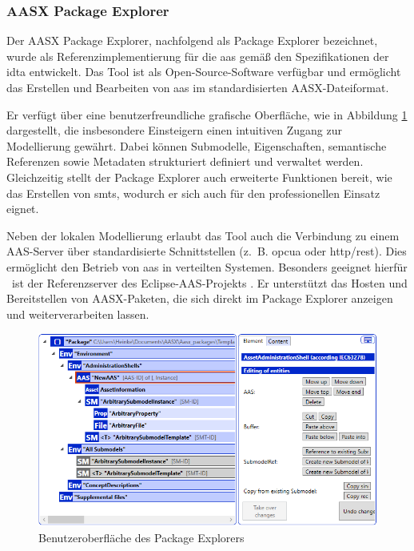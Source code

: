 \subsubsection{AASX Package Explorer}
Der AASX Package Explorer, nachfolgend als Package Explorer bezeichnet, wurde als Referenzimplementierung für die \acs{aas} gemäß den Spezifikationen der \acs{idta} entwickelt.
Das Tool ist als Open-Source-Software \cite{AASXPackageExplorer} verfügbar und ermöglicht das Erstellen und Bearbeiten von \acs{aas} im standardisierten AASX-Dateiformat.

Er verfügt über eine benutzerfreundliche grafische Oberfläche, wie in Abbildung \ref{fig:AASXPackageExplorer} dargestellt, die insbesondere Einsteigern einen intuitiven Zugang zur Modellierung gewährt.
Dabei können Submodelle, Eigenschaften, semantische Referenzen sowie Metadaten strukturiert definiert und verwaltet werden.
Gleichzeitig stellt der Package Explorer auch erweiterte Funktionen bereit, wie das Erstellen von \acsp{smt}, wodurch er sich auch für den professionellen Einsatz eignet.

Neben der lokalen Modellierung erlaubt das Tool auch die Verbindung zu einem AAS-Server über standardisierte Schnittstellen (z.~B. \acs{opcua} oder \acs{http}/\acs{rest}).
Dies ermöglicht den Betrieb von \acs{aas} in verteilten Systemen.
Besonders geeignet hierfür%
\pagebreak
~ist der Referenzserver des Eclipse-AAS-Projekts \cite{AASXServer}.
Er unterstützt das Hosten und Bereitstellen von AASX-Paketen, die sich direkt im Package Explorer anzeigen und weiterverarbeiten lassen.

\begin{figure}[htbp]
    \centering
    \includegraphics[scale=0.765]{Bilder/ModellierungAAS/Final/Grundlagen_PE.PNG}
    \caption[Benutzeroberfläche des Package Explorers]{Benutzeroberfläche des Package Explorers} 
    \label{fig:AASXPackageExplorer}
\end{figure}

